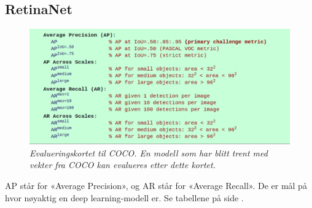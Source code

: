



\subsection{RetinaNet}

\begin{figure}[h!]
\begin{center} 
\includegraphics[scale=0.35]{figures/coco}
\caption{\small \sl Evalueringskortet til COCO. En modell som har blitt trent med vekter fra COCO kan evalueres etter dette kortet. \label{fig:coco}}
\end{center}
\end{figure}

AP står for «Average Precision», og AR står for «Average Recall». De er mål på hvor nøyaktig en deep learning-modell er. Se tabellene på side \pageref{tab:ap_retinanet}.

